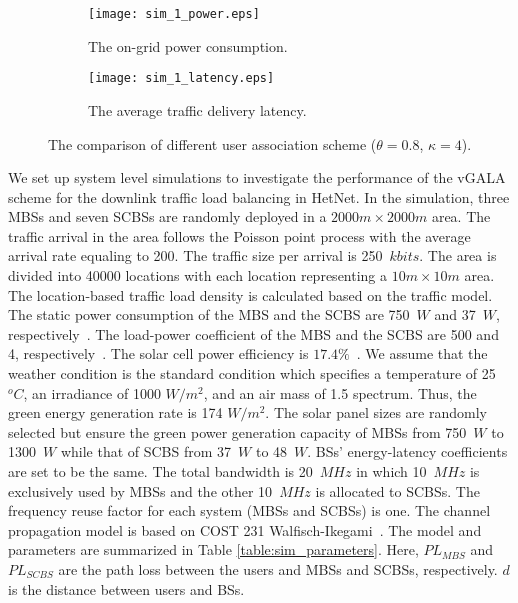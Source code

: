 \documentclass[journal]{IEEEtran}
\theoremstyle{definition}
\begin{document}
\begin{figure*}[ht]
\centering
\hspace*{\fill}
    \begin{subfigure}[b]{0.5\textwidth}
            \texttt{[image: sim\_1\_power.eps]}
            \caption{The on-grid power consumption.}
            \label{fig:sim_1_power}
    \end{subfigure}\begin{subfigure}[b]{0.5\textwidth}
            \texttt{[image: sim\_1\_latency.eps]}
            \caption{The average traffic delivery latency.}
            \label{fig:sim_1_latency}
   \end{subfigure}\hfill
   \caption{The comparison of different user association scheme ($\theta=0.8$, $\kappa=4$).
     }\label{fig:sim_1_power_latency}
\end{figure*}

We set up system level simulations to investigate the performance of the vGALA scheme for the downlink traffic load balancing in HetNet. In the simulation, three MBSs and seven SCBSs are randomly deployed in a $2000 m \times 2000 m$ area. The traffic arrival in the area follows the Poisson point process with the average arrival rate equaling to 200. The traffic size per arrival is 250~$kbits$. The area is divided into 40000 locations with each location representing a $10 m \times 10 m$ area. The location-based traffic load density is calculated based on the traffic model.
The static power consumption of the MBS and the SCBS are 750~$W$ and 37~$W$, respectively~\cite{Auer:2011:HME}. The load-power coefficient of the MBS and the SCBS are 500 and 4, respectively~\cite{Auer:2011:HME}. The solar cell power efficiency is $17.4\%$~\cite{HIT:Photo}. We assume that the weather condition is the standard condition which specifies a temperature of 25 $^{o}C$, an irradiance of 1000 $W/m^{2}$, and an air mass of 1.5 spectrum. Thus, the green energy generation rate is 174 $W/m^{2}$. The solar panel sizes are randomly selected but ensure the green power generation capacity of MBSs from 750~$W$ to 1300~$W$ while that of SCBS from 37~$W$ to 48~$W$. BSs' energy-latency coefficients are set to be the same.
The total bandwidth is 20~$MHz$ in which 10~$MHz$ is exclusively used by MBSs and the other 10~$MHz$ is allocated to SCBSs. The frequency reuse factor for each system (MBSs and SCBSs) is one. The channel propagation model is based on COST 231 Walfisch-Ikegami~\cite{COST231}. The model and parameters are summarized in Table \ref{table:sim_parameters}. Here, $PL_{MBS}$ and $PL_{SCBS}$ are the path loss between the users and MBSs and SCBSs, respectively. $d$ is the distance between users and BSs.
\end{document}
